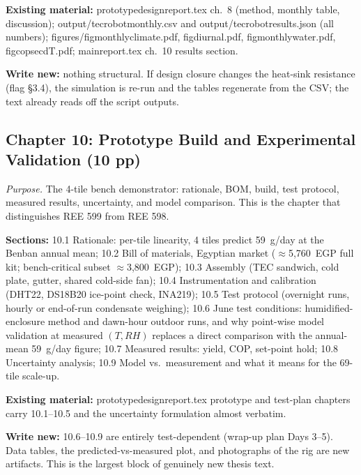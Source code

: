 \documentclass[11pt,a4paper]{article}
\newcommand{\f}[1]{{\ttfamily\def\_{\textunderscore\allowbreak}#1}}
\begin{document}
\textbf{Existing material:} \f{prototype\_design\_report.tex} ch.~8 (method,
monthly table, discussion); \f{output/tec\_robot\_monthly.csv} and
\f{output/tec\_robot\_results.json} (all numbers);
\f{figures/fig\_monthly\_climate.pdf}, \f{fig\_diurnal.pdf},
\f{fig\_monthly\_water.pdf}, \f{fig\_cop\_sec\_dT.pdf};
\f{main\_report.tex} ch.~10 results section.

\textbf{Write new:} nothing structural. If design closure changes the heat-sink
resistance (flag \S3.4), the simulation is re-run and the tables regenerate
from the CSV; the text already reads off the script outputs.

\subsection{Chapter 10: Prototype Build and Experimental Validation (10 pp)}
\textit{Purpose.} The 4-tile bench demonstrator: rationale, BOM, build, test
protocol, measured results, uncertainty, and model comparison. This is the
chapter that distinguishes REE 599 from REE 598.

\textbf{Sections:} 10.1 Rationale: per-tile linearity, 4 tiles predict
59~g/day at the Benban annual mean; 10.2 Bill of materials, Egyptian market
($\approx$5{,}760~EGP full kit; bench-critical subset $\approx$3{,}800~EGP);
10.3 Assembly (TEC sandwich, cold plate, gutter, shared cold-side fan); 10.4
Instrumentation and calibration (DHT22, DS18B20 ice-point check, INA219); 10.5
Test protocol (overnight runs, hourly or end-of-run condensate weighing); 10.6
June test conditions: humidified-enclosure method and dawn-hour outdoor runs,
and why point-wise model validation at measured $(T, RH)$ replaces a direct
comparison with the annual-mean 59~g/day figure; 10.7 Measured results: yield,
COP, set-point hold; 10.8 Uncertainty analysis; 10.9 Model vs.\ measurement and
what it means for the 69-tile scale-up.

\textbf{Existing material:} \f{prototype\_design\_report.tex} prototype and
test-plan chapters carry 10.1--10.5 and the uncertainty formulation almost
verbatim.

\textbf{Write new:} 10.6--10.9 are entirely test-dependent (wrap-up plan Days
3--5). Data tables, the predicted-vs-measured plot, and photographs of the rig
are new artifacts. This is the largest block of genuinely new thesis text.

\end{document}
